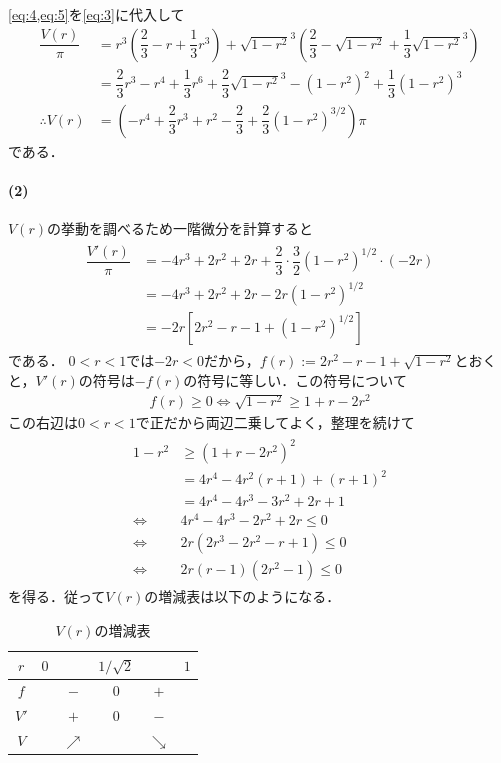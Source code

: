 \documentclass[../../main.tex]{subfiles}
\begin{document}
\cref{eq:4,eq:5}を\cref{eq:3}に代入して
\begin{align}
  \dfrac{V(r)}{\pi}
  &=r^3\left(\dfrac{2}{3}-r+\dfrac{1}{3}r^3\right)+\sqrt{1-r^2}^3\left(\dfrac{2}{3}-\sqrt{1-r^2}+\dfrac{1}{3}\sqrt{1-r^2}^3\right) \\
  &=\dfrac{2}{3}r^3-r^4+\dfrac{1}{3}r^6+\dfrac{2}{3}\sqrt{1-r^2}^3-(1-r^2)^2+\dfrac{1}{3}(1-r^2)^3 \\
  \therefore
  V(r)&=\left(-r^4+\dfrac{2}{3}r^3+r^2-\dfrac{2}{3}+\dfrac{2}{3}(1-r^2)^{3/2}\right)\pi  \label{eq:6}
\end{align}
である．

\paragraph{(2)}

$V(r)$の挙動を調べるため一階微分を計算すると
\begin{align}
  \begin{split}
    \dfrac{V'(r)}{\pi}
    &=-4r^3+2r^2+2r+\dfrac{2}{3}\cdot\dfrac{3}{2}(1-r^2)^{1/2}\cdot(-2r) \\
    &=-4r^3+2r^2+2r-2r(1-r^2)^{1/2} \\
    &=-2r\left[2r^2-r-1+(1-r^2)^{1/2}\right]
  \end{split}
\end{align}
である．
$0<r<1$では$-2r<0$だから，$f(r):=2r^2-r-1+\sqrt{1-r^2}$とおくと，$V'(r)$の符号は$-f(r)$の符号に等しい．この符号について
\begin{align}
  f(r)\ge0 \iff \sqrt{1-r^2} \ge 1+r-2r^2
\end{align}
この右辺は$0<r<1$で正だから両辺二乗してよく，整理を続けて
\begin{align}
  \begin{split}
    1-r^2& \ge(1+r-2r^2)^2\\
    &=4r^4-4r^2(r+1)+(r+1)^2 \\
    &=4r^4-4r^3-3r^2+2r+1 \\
    \iff
    & 4r^4-4r^3-2r^2+2r\le 0 \\
    \iff
    & 2r(2r^3-2r^2-r+1)\le0 \\
    \iff
    &2r(r-1)(2r^2-1)\le 0
  \end{split}
\end{align}
を得る．従って$V(r)$の増減表は以下のようになる．

\begin{table}[htb]
  \centering
  \caption{$V(r)$の増減表}
  \begin{tabular}{c|ccccc}
    $r$ & $0$ & & $1/\sqrt{2}$ & & $1$ \\
    \hline
    $f$ & & $-$ & $0$ & $+$ & \\
    \hline
    $V'$ & & $+$ & $0$ & $-$ & \\
    \hline
    $V$ & & $\nearrow$ & & $\searrow$ &
  \end{tabular}
\end{table}
\end{document}
